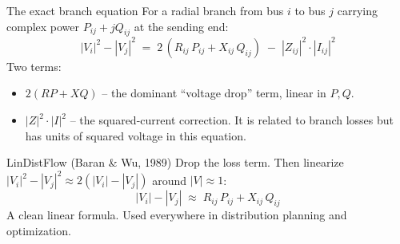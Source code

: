 \documentclass[aspectratio=169,10pt]{beamer}
\begin{document}
\begin{frame}{The exact branch equation}
For a radial branch from bus $i$ to bus $j$ carrying complex power $P_{ij} + jQ_{ij}$ at the sending end:
\begin{equation*}
|V_i|^2 - |V_j|^2 \;=\; 2\,(R_{ij}\,P_{ij} + X_{ij}\,Q_{ij}) \;-\; |Z_{ij}|^2 \cdot |I_{ij}|^2
\end{equation*}
Two terms:
\begin{itemize}
  \item $2(R P + X Q)$ -- the dominant ``voltage drop'' term, linear in $P, Q$.
  \item $|Z|^2 \cdot |I|^2$ -- the squared-current correction. It is related to branch losses but has units of squared voltage in this equation.
\end{itemize}
\vspace{0.5em}
\begin{block}{LinDistFlow (Baran \& Wu, 1989)}
Drop the loss term. Then linearize $|V_i|^2 - |V_j|^2 \approx 2(|V_i| - |V_j|)$ around $|V| \approx 1$:
\begin{equation*}
\boxed{\;|V_i| - |V_j| \;\approx\; R_{ij}\,P_{ij} + X_{ij}\,Q_{ij}\;}
\end{equation*}
A clean linear formula. Used everywhere in distribution planning and optimization.
\end{block}
\end{frame}
\end{document}
